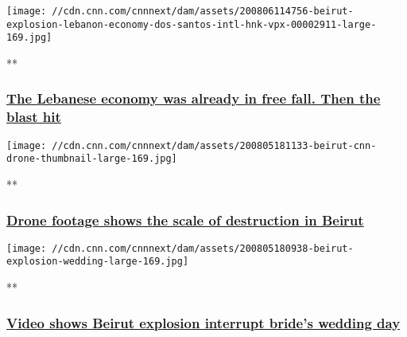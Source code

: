 \href{/videos/business/2020/08/06/beirut-explosion-lebanon-economy-dos-santos-intl-hnk-vpx.cnn/video/playlists/around-the-world/}{}

\texttt{[image: //cdn.cnn.com/cnnnext/dam/assets/200806114756-beirut-explosion-lebanon-economy-dos-santos-intl-hnk-vpx-00002911-large-169.jpg]}

**

\hypertarget{the-lebanese-economy-was-already-in-free-fall-then-the-blast-hit}{%
\subsubsection{\texorpdfstring{\href{/videos/business/2020/08/06/beirut-explosion-lebanon-economy-dos-santos-intl-hnk-vpx.cnn/video/playlists/around-the-world/}{The
Lebanese economy was already in free fall. Then the blast
hit}}{The Lebanese economy was already in free fall. Then the blast hit}}\label{the-lebanese-economy-was-already-in-free-fall-then-the-blast-hit}}

\href{/videos/world/2020/08/05/beirut-explosion-lebanon-destruction-drone-video-lon-orig-bks.cnn/video/playlists/around-the-world/}{}

\texttt{[image: //cdn.cnn.com/cnnnext/dam/assets/200805181133-beirut-cnn-drone-thumbnail-large-169.jpg]}

**

\hypertarget{drone-footage-shows-the-scale-of-destruction-in-beirut}{%
\subsubsection{\texorpdfstring{\href{/videos/world/2020/08/05/beirut-explosion-lebanon-destruction-drone-video-lon-orig-bks.cnn/video/playlists/around-the-world/}{Drone
footage shows the scale of destruction in
Beirut}}{Drone footage shows the scale of destruction in Beirut}}\label{drone-footage-shows-the-scale-of-destruction-in-beirut}}

\href{/videos/world/2020/08/05/beirut-explosion-wedding-video-zw-orig.cnn/video/playlists/around-the-world/}{}

\texttt{[image: //cdn.cnn.com/cnnnext/dam/assets/200805180938-beirut-explosion-wedding-large-169.jpg]}

**

\hypertarget{video-shows-beirut-explosion-interrupt-brides-wedding-day}{%
\subsubsection{\texorpdfstring{\href{/videos/world/2020/08/05/beirut-explosion-wedding-video-zw-orig.cnn/video/playlists/around-the-world/}{Video
shows Beirut explosion interrupt bride's wedding
day}}{Video shows Beirut explosion interrupt bride's wedding day}}\label{video-shows-beirut-explosion-interrupt-brides-wedding-day}}


